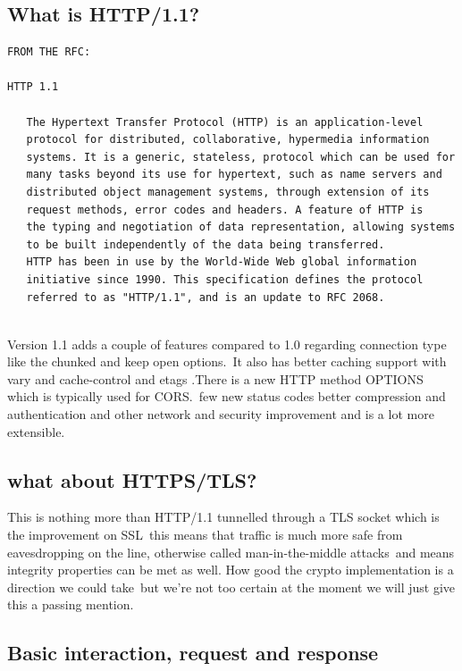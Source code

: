 \subsection{What is HTTP/1.1?}

\begin{verbatim}
FROM THE RFC:

HTTP 1.1

   The Hypertext Transfer Protocol (HTTP) is an application-level
   protocol for distributed, collaborative, hypermedia information
   systems. It is a generic, stateless, protocol which can be used for
   many tasks beyond its use for hypertext, such as name servers and
   distributed object management systems, through extension of its
   request methods, error codes and headers. A feature of HTTP is
   the typing and negotiation of data representation, allowing systems
   to be built independently of the data being transferred.
   HTTP has been in use by the World-Wide Web global information
   initiative since 1990. This specification defines the protocol
   referred to as "HTTP/1.1", and is an update to RFC 2068.
  
\end{verbatim}
 
Version 1.1 adds a couple of features compared to 1.0 regarding connection type like the chunked and keep open options.\
It also has better caching support with vary and cache-control and etags .There is a new HTTP method OPTIONS which is typically used for CORS.\
few new status codes better compression and authentication and other network and security improvement and is a lot more extensible.\\
  
\subsection{what about HTTPS/TLS?}

This is nothing more than HTTP/1.1 tunnelled through a TLS socket which is the improvement on SSL\
this means that traffic is much more safe from eavesdropping on the line, otherwise called man-in-the-middle attacks\
and means integrity properties can be met as well. How good the crypto implementation is a direction we could take\
but we're not too certain at the moment we will just give this a passing mention.\\

\subsection{Basic interaction, request and response}

